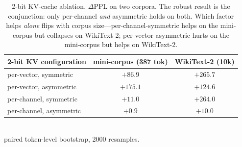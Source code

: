 \begin{table}[t]\centering\small
\caption{2-bit KV-cache ablation, $\Delta$PPL on two corpora. The robust result is
the conjunction: only per-channel \emph{and} asymmetric holds on both. Which factor
helps \emph{alone} flips with corpus size---per-channel-symmetric helps on the
mini-corpus but collapses on WikiText-2; per-vector-asymmetric hurts on the
mini-corpus but helps on WikiText-2.}
\label{tab:ablation}
\begin{tabular}{lcc}
\toprule
2-bit KV configuration & mini-corpus (387 tok) & WikiText-2 (10k)\\
\midrule
per-vector, symmetric & $+86.9$ & $+265.7$\\
per-vector, asymmetric & $+175.1$ & $+124.6$\\
per-channel, symmetric & $+11.0$ & $+264.0$\\
per-channel, asymmetric & $\mathbf{+0.9}$ & $\mathbf{+10.0}$\\
\bottomrule
\end{tabular}
\\[2pt]{\footnotesize paired token-level bootstrap, 2000 resamples.}
\end{table}
